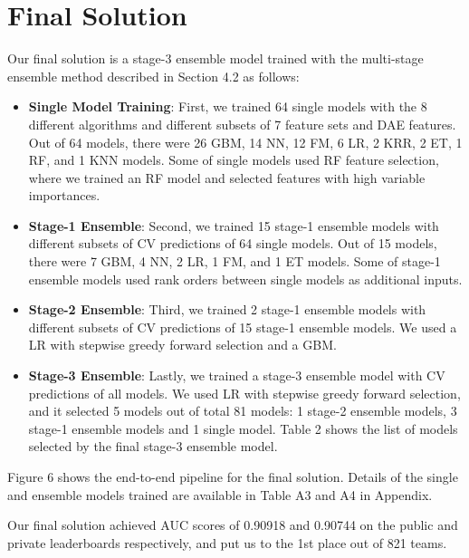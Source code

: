 \section{Final Solution}
Our final solution is a stage-3 ensemble model trained with the multi-stage ensemble method described in Section 4.2 as follows:
\begin{itemize}
  \setlength\itemsep{0em}
  \item \textbf{Single Model Training}: First, we trained 64 single models with the 8 different algorithms and different subsets of 7 feature sets and DAE features.  Out of 64 models, there were 26 GBM, 14 NN, 12 FM, 6 LR, 2 KRR, 2 ET, 1 RF, and 1 KNN models.  Some of single models used RF feature selection, where we trained an RF model and selected features with high variable importances.
  \item \textbf{Stage-1 Ensemble}: Second, we trained 15 stage-1 ensemble models with different subsets of CV predictions of 64 single models.  Out of 15 models, there were 7 GBM, 4 NN, 2 LR, 1 FM, and 1 ET models.  Some of stage-1 ensemble models used rank orders between single models as additional inputs.  
  \item \textbf{Stage-2 Ensemble}: Third, we trained 2 stage-1 ensemble models with different subsets of CV predictions of 15 stage-1 ensemble models.  We used a LR with stepwise greedy forward selection and a GBM.
  \item \textbf{Stage-3 Ensemble}: Lastly, we trained a stage-3 ensemble model with CV predictions of all models.  We used LR with stepwise greedy forward selection, and it selected 5 models out of total 81 models: 1 stage-2 ensemble models, 3 stage-1 ensemble models and 1 single model.  Table 2 shows the list of models selected by the final stage-3 ensemble model.
\end{itemize}

Figure 6 shows the end-to-end pipeline for the final solution.  Details of the single and ensemble models trained are available in Table A3 and A4 in Appendix.

Our final solution achieved AUC scores of 0.90918 and 0.90744 on the public and private leaderboards respectively, and put us to the 1st place out of 821 teams.


